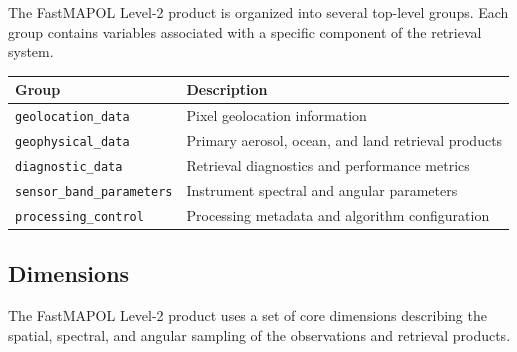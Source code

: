 \documentclass[
  11pt,
  letterpaper,
]{scrreprt}
\begin{document}
The FastMAPOL Level-2 product is organized into several top-level
groups. Each group contains variables associated with a specific
component of the retrieval system.

\begin{longtable}[]{@{}
  >{\raggedright\arraybackslash}p{}
  >{\raggedright\arraybackslash}p{}@{}}
\toprule\noalign{}
\begin{minipage}[b]{\linewidth}\raggedright
Group
\end{minipage} & \begin{minipage}[b]{\linewidth}\raggedright
Description
\end{minipage} \\
\midrule\noalign{}
\endhead
\bottomrule\noalign{}
\endlastfoot
\texttt{geolocation\_data} & Pixel geolocation information \\
\texttt{geophysical\_data} & Primary aerosol, ocean, and land retrieval
products \\
\texttt{diagnostic\_data} & Retrieval diagnostics and performance
metrics \\
\texttt{sensor\_band\_parameters} & Instrument spectral and angular
parameters \\
\texttt{processing\_control} & Processing metadata and algorithm
configuration \\
\end{longtable}

\subsection{Dimensions}\label{dimensions}

The FastMAPOL Level-2 product uses a set of core dimensions describing
the spatial, spectral, and angular sampling of the observations and
retrieval products.
\end{document}
